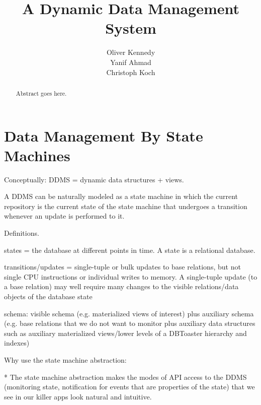 \documentclass{sig-alternate}
\begin{document}
\title{A Dynamic Data Management System}
\author{
\alignauthor
Oliver Kennedy\\
\alignauthor
Yanif Ahmad\\
\alignauthor
Christoph Koch\\
}
\maketitle

\begin{abstract}
Abstract goes here.
\end{abstract}



\section{Data Management By State Machines}


Conceptually: DDMS = dynamic data structures + views.



A DDMS can be naturally modeled as a state machine in which the current repository is the current state of the state machine that undergoes a transition whenever an update is performed to it.

Definitions.

states = the database at different points in time. A state is a relational database.

transitions/updates = single-tuple or bulk updates to base relations, but not single CPU instructions or individual writes to memory. A single-tuple update (to a base relation) may well require many changes to the visible relations/data objects of the database state

schema: visible schema (e.g. materialized views of interest) plus auxiliary schema (e.g. base relations that we do not want to monitor plus auxiliary data structures such as auxiliary materialized views/lower levels of a DBToaster hierarchy and indexes)




Why use the state machine abstraction:

* The state machine abstraction makes the modes of API access to the DDMS (monitoring state, notification for events that are properties of the state) that we see in our killer apps look natural and intuitive.
\end{document}

